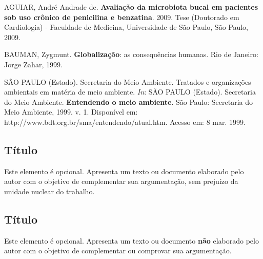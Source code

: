 \documentclass[
  oneside, %
  english,
  brazil
]{abntbibufjf}
\begin{document}
\begin{thebibliography}{99}
  AGUIAR, André Andrade de.
  \textbf{Avaliação da microbiota bucal em pacientes sob uso crônico de penicilina e benzatina}.
  2009.
  Tese (Doutorado em Cardiologia) - Faculdade de Medicina, Universidade de São Paulo, São Paulo, 2009.

  BAUMAN, Zygmunt.
  \textbf{Globalização}: as consequências humanas.
  Rio de Janeiro: Jorge Zahar, 1999.

  SÃO PAULO (Estado).
  Secretaria do Meio Ambiente.
  Tratados e organizações ambientais em matéria de meio ambiente.
  \textit{In}: SÃO PAULO (Estado).
  Secretaria do Meio Ambiente.
  \textbf{Entendendo o meio ambiente}.
  São Paulo: Secretaria do Meio Ambiente, 1999. v. 1.
  Disponível em:
  http://www.bdt.org.br/sma/entendendo/atual.htm. Acesso em: 8 mar. 1999.

\end{thebibliography}



\begin{apendices}
  \chapter{\apendseq{} Título}
  Este elemento é opcional.
  Apresenta um texto ou documento elaborado pelo autor com o objetivo de complementar sua argumentação, sem prejuízo da unidade nuclear do trabalho.
\end{apendices}


\begin{anexos}
  \chapter{\anexoseq{} Título}
  Este elemento é opcional.
  Apresenta um texto ou documento \textbf{não} elaborado pelo autor com o objetivo de complementar ou comprovar sua argumentação.
\end{anexos}



\end{document}

